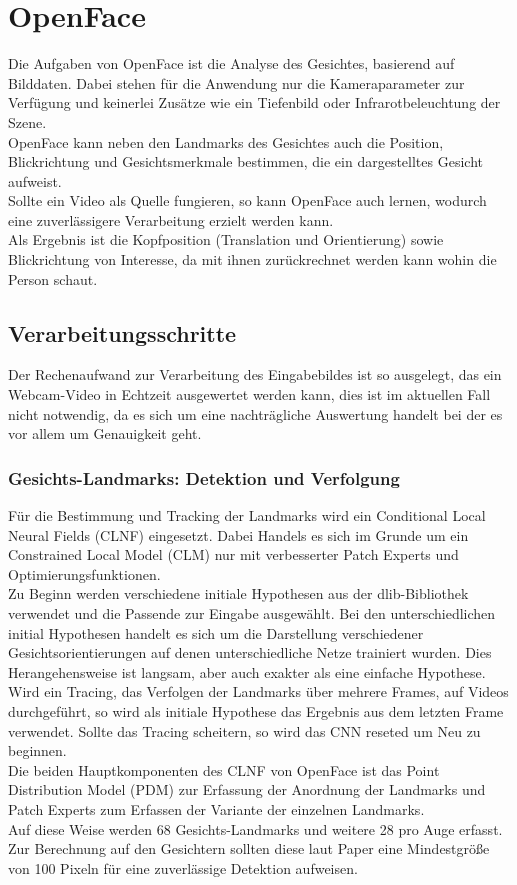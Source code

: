 \section{OpenFace}
Die Aufgaben von OpenFace ist die Analyse des Gesichtes, basierend auf Bilddaten. Dabei stehen für die Anwendung nur die Kameraparameter zur Verfügung und keinerlei Zusätze wie ein Tiefenbild oder Infrarotbeleuchtung der Szene.\\
OpenFace kann neben den Landmarks des Gesichtes auch die Position, Blickrichtung und Gesichtsmerkmale bestimmen, die ein dargestelltes Gesicht aufweist.\\
Sollte ein Video als Quelle fungieren, so kann OpenFace auch lernen, wodurch eine zuverlässigere Verarbeitung erzielt werden kann.\\
Als Ergebnis ist die Kopfposition (Translation und Orientierung) sowie Blickrichtung von Interesse, da mit ihnen zurückrechnet werden kann wohin die Person schaut.
\subsection{Verarbeitungsschritte}
Der Rechenaufwand zur Verarbeitung des Eingabebildes ist so ausgelegt, das ein Webcam-Video in Echtzeit ausgewertet werden kann, dies ist im aktuellen Fall nicht notwendig, da es sich um eine nachträgliche Auswertung handelt bei der es vor allem um Genauigkeit geht.
\subsubsection{Gesichts-Landmarks: Detektion und Verfolgung}
Für die Bestimmung und Tracking der Landmarks wird ein Conditional Local Neural Fields (CLNF) eingesetzt. Dabei Handels es sich im Grunde um ein Constrained Local Model (CLM) nur mit verbesserter Patch Experts und Optimierungsfunktionen.\\
Zu Beginn werden verschiedene initiale Hypothesen aus der dlib-Bibliothek verwendet und die Passende zur Eingabe ausgewählt. Bei den unterschiedlichen initial Hypothesen handelt es sich um die Darstellung verschiedener Gesichtsorientierungen auf denen unterschiedliche Netze trainiert wurden. Dies Herangehensweise ist langsam, aber auch exakter als eine einfache Hypothese. Wird ein Tracing, das Verfolgen der Landmarks über mehrere Frames, auf Videos durchgeführt, so wird als initiale Hypothese das Ergebnis aus dem letzten Frame verwendet. Sollte das Tracing scheitern, so wird das CNN reseted um Neu zu beginnen.\\
Die beiden Hauptkomponenten des CLNF von OpenFace ist das Point Distribution Model (PDM) zur Erfassung der Anordnung der Landmarks und Patch Experts zum Erfassen der Variante der einzelnen Landmarks.\\
Auf diese Weise werden 68 Gesichts-Landmarks und  weitere 28 pro Auge erfasst. Zur Berechnung auf den Gesichtern sollten diese laut Paper \cite{OpenFace} eine Mindestgröße von 100 Pixeln für eine zuverlässige Detektion aufweisen.
